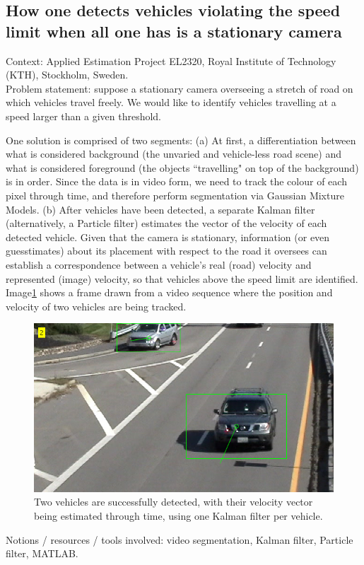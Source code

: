 \subsection{How one detects vehicles violating the speed limit when
all one has is a stationary camera}

Context: Applied Estimation Project EL2320, Royal Institute of Technology (KTH),
Stockholm, Sweden.\\

Problem statement: suppose a stationary camera overseeing a stretch of road on
which vehicles travel freely. We would like to identify vehicles travelling at
a speed larger than a given threshold.

One solution is comprised of two segments: (a) At first, a differentiation
between what is considered background (the unvaried and vehicle-less road scene)
and what is considered foreground (the objects ``travelling" on top of the
background) is in order. Since the data is in video form, we need to track
the colour of each pixel through time, and therefore perform segmentation via
Gaussian Mixture Models. (b) After vehicles have been detected, a separate
Kalman filter (alternatively, a Particle filter) estimates the vector of the
velocity of each detected vehicle. Given that the camera is stationary,
information (or even guesstimates) about its placement with respect to the
road it oversees can establish a correspondence between a vehicle's real (road)
velocity and represented (image) velocity, so that vehicles above the speed
limit are identified. Image\ref{fig:kf_1} shows a frame drawn from a video
sequence where the position and velocity of two vehicles are being tracked.

\begin{figure}[H]\centering
  \includegraphics[scale=0.55]{images/kf_1.png}
  \caption{Two vehicles are successfully detected, with their velocity vector
    being estimated through time, using one Kalman filter per vehicle.}
  \label{fig:kf_1}
\end{figure}

Notions / resources / tools involved: video segmentation, Kalman filter,
Particle filter, MATLAB.
